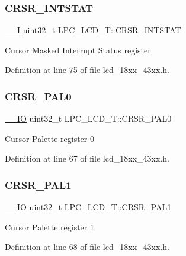 \subsubsection{\texorpdfstring{C\+R\+S\+R\+\_\+\+I\+N\+T\+S\+T\+AT}{CRSR\_INTSTAT}}
{\footnotesize\ttfamily \hyperlink{core__sc300_8h_af63697ed9952cc71e1225efe205f6cd3}{\+\_\+\+\_\+I} uint32\+\_\+t L\+P\+C\+\_\+\+L\+C\+D\+\_\+\+T\+::\+C\+R\+S\+R\+\_\+\+I\+N\+T\+S\+T\+AT}

Cursor Masked Interrupt Status register 

Definition at line 75 of file lcd\+\_\+18xx\+\_\+43xx.\+h.

\mbox{\label{struct_l_p_c___l_c_d___t_ae791a314c1f277d155aef32843abfd3b}} 
\subsubsection{\texorpdfstring{C\+R\+S\+R\+\_\+\+P\+A\+L0}{CRSR\_PAL0}}
{\footnotesize\ttfamily \hyperlink{core__sc300_8h_aec43007d9998a0a0e01faede4133d6be}{\+\_\+\+\_\+\+IO} uint32\+\_\+t L\+P\+C\+\_\+\+L\+C\+D\+\_\+\+T\+::\+C\+R\+S\+R\+\_\+\+P\+A\+L0}

Cursor Palette register 0 

Definition at line 67 of file lcd\+\_\+18xx\+\_\+43xx.\+h.

\mbox{\label{struct_l_p_c___l_c_d___t_aa3cb594358b5c6235358dafa4b6616e2}} 
\subsubsection{\texorpdfstring{C\+R\+S\+R\+\_\+\+P\+A\+L1}{CRSR\_PAL1}}
{\footnotesize\ttfamily \hyperlink{core__sc300_8h_aec43007d9998a0a0e01faede4133d6be}{\+\_\+\+\_\+\+IO} uint32\+\_\+t L\+P\+C\+\_\+\+L\+C\+D\+\_\+\+T\+::\+C\+R\+S\+R\+\_\+\+P\+A\+L1}

Cursor Palette register 1 

Definition at line 68 of file lcd\+\_\+18xx\+\_\+43xx.\+h.

